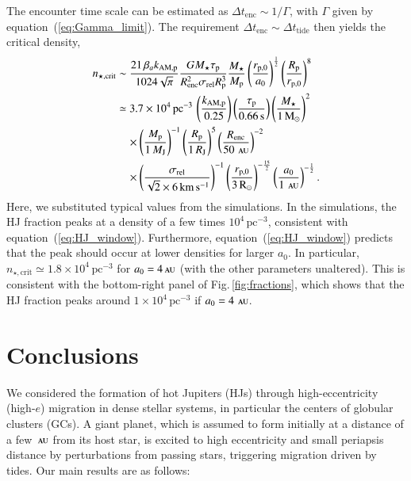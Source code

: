 \documentclass[iop,usenatbib]{emulateapj}
\newcommand{\F}{Fig.}
\newcommand{\msun}{\mathrm{M}_\odot}
\newcommand{\rsun}{\mathrm{R}_\odot}
\newcommand{\au}{\,\textsc{au}}
\newcommand{\renc}{R_\mathrm{enc}}
\newcommand{\srel}{\sigma_\mathrm{rel}}
\begin{document}
The encounter time scale can be estimated as $\Delta t_\mathrm{enc} \sim 1/\Gamma$, with $\Gamma$ given by equation~(\ref{eq:Gamma_limit}). The requirement $\Delta t_\mathrm{enc} \sim \Delta t_\mathrm{tide}$ then yields the critical density,
\begin{align}
\label{eq:HJ_window}
\nonumber n_{\star,\mathrm{crit}} &\sim \frac{21 \, \beta_a k_\mathrm{AM,p} }{1024 \sqrt{\pi}} \frac{G M_\star \tau_\mathrm{p}}{\renc^2 \srel R_\mathrm{p}^3} \frac{M_\star}{M_\mathrm{p}} \left ( \frac{r_\mathrm{p,0}}{a_0} \right )^{\frac{1}{2}} \left ( \frac{R_\mathrm{p}}{r_\mathrm{p,0}} \right )^8 \\
\nonumber &\simeq 3.7 \times 10^4 \, \mathrm{pc^{-3}} \, \left ( \frac{k_\mathrm{AM,p}}{0.25} \right )  \left ( \frac{\tau_\mathrm{p}}{0.66\,\mathrm{s}} \right ) \left ( \frac{M_\star}{1\,\msun} \right)^2 \\
\nonumber &\quad \times \left ( \frac{M_\mathrm{p}}{1 \, M_\mathrm{J}} \right )^{-1}  \left ( \frac{R_\mathrm{p}}{1\,R_\mathrm{J}} \right )^5 \left ( \frac{\renc}{50\,\au} \right )^{-2}  \\
&\quad \times \left ( \frac{\srel}{ \sqrt{2}\times 6 \,\mathrm{km \, s^{-1}} } \right )^{-1}  \left ( \frac{r_\mathrm{p,0}}{3 \, \rsun} \right )^{-\frac{15}{2}}  \left ( \frac{a_0}{1\,\au} \right )^{-\frac{1}{2}}.
\end{align}
Here, we substituted typical values from the simulations. In the simulations, the HJ fraction peaks at a density of a few times $10^4\,\mathrm{pc^{-3}}$, consistent with equation~(\ref{eq:HJ_window}). Furthermore, equation~(\ref{eq:HJ_window}) predicts that the peak should occur at lower densities for larger $a_0$. In particular, $n_{\star,\mathrm{crit}} \simeq 1.8 \times 10^4 \, \mathrm{pc^{-3}}$ for $a_0=4\au$ (with the other parameters unaltered). This is consistent with the bottom-right panel of \F\,\ref{fig:fractions}, which shows that the HJ fraction peaks around $1\times10^4\,\mathrm{pc^{-3}}$ if $a_0=4\,\au$.


\section{Conclusions}
\label{sect:conclusions}

We considered the formation of hot Jupiters (HJs) through high-eccentricity (high-$e$) migration in dense stellar systems, in particular the centers of globular clusters (GCs). A giant planet, which is assumed to form initially at a distance of a few $\au$ from its host star, is excited to high eccentricity and small periapsis distance by perturbations from passing stars, triggering migration driven by tides. Our main results are as follows:
\end{document}
